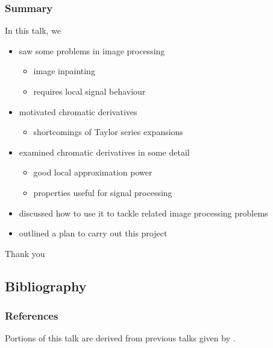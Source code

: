 \documentclass{beamer}
\begin{document}
\begin{frame}
\frametitle{Summary}

In this talk, we

\begin{itemize}
	\item saw some problems in image processing 
	\begin{itemize}
		\item image inpainting
		\item requires local signal behaviour
	\end{itemize} 
	\item motivated chromatic derivatives 
	\begin{itemize}
		\item shortcomings of Taylor series expansions
	\end{itemize} 
	\item examined chromatic derivatives in some detail
	\begin{itemize}
		\item good local approximation power
		\item properties useful for signal processing 
	\end{itemize}
	\item discussed how to use it to tackle related image processing problems
	\item outlined a plan to carry out this project
\end{itemize}

\pause

\begin{center}
\Large Thank you
\end{center}

\end{frame}

\subsection{Bibliography}

\begin{frame}[allowframebreaks]
	\frametitle{References}
	Portions of this talk are derived from previous talks given by \cite{Ignjatovic2011,Liu2011}.

	
	
\end{frame}

\end{document}
